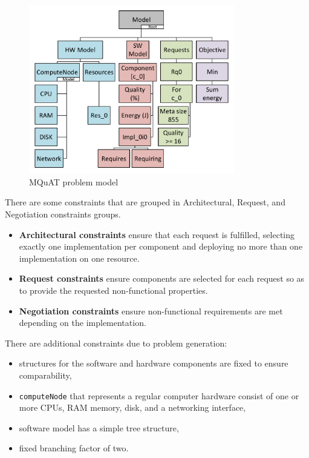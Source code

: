 \begin{figure}
	\centering
	\includegraphics[width=0.8\textwidth]{images/MQuATModel.pdf}
	\caption[MQuAT problem model]{MQuAT problem model}
	\label{fig:mquatmodel}
\end{figure}



There are some constraints that are grouped in Architectural, Request, and Negotiation constraints groups.

\begin{itemize}
	\item \textbf{Architectural constraints} ensure that each request is fulfilled, selecting exactly one implementation per component and deploying no more than one implementation on one resource.
	\item \textbf{Request constraints} ensure components are selected for each request so as to provide the requested non-functional properties.
	\item \textbf{Negotiation constraints} ensure non-functional requirements are met depending on the implementation.
\end{itemize}

There are additional constraints due to problem generation:

\begin{itemize}
	\item structures for the software and hardware components are fixed to ensure comparability,
	\item \texttt{computeNode} that represents a regular computer hardware consist of one or more CPUs, RAM memory, disk, and a networking interface,
	\item software model has a simple tree structure,
	\item fixed branching factor of two.
\end{itemize}

